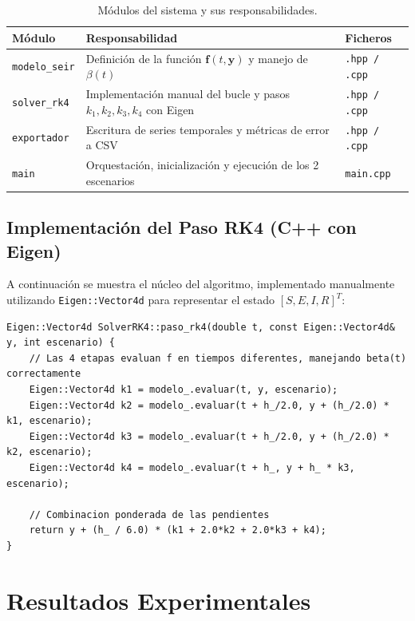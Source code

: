\documentclass[12pt,a4paper]{article}
\theoremstyle{definition}
\newcommand{\vect}[1]{\mathbf{#1}}
\begin{document}
\begin{table}[H]
\centering
\caption{M\'{o}dulos del sistema y sus responsabilidades.}
\label{tab:modulos}
\begin{tabular}{@{}lp{7cm}l@{}}
\toprule
\textbf{M\'{o}dulo} & \textbf{Responsabilidad} & \textbf{Ficheros} \\
\midrule
\texttt{modelo\_seir} & Definici\'{o}n de la funci\'{o}n $\vect{f}(t, \vect{y})$ y manejo de $\beta(t)$ & \texttt{.hpp / .cpp} \\
\texttt{solver\_rk4} & Implementaci\'{o}n manual del bucle y pasos $k_1, k_2, k_3, k_4$ con Eigen & \texttt{.hpp / .cpp} \\
\texttt{exportador} & Escritura de series temporales y m\'{e}tricas de error a CSV & \texttt{.hpp / .cpp} \\
\texttt{main} & Orquestaci\'{o}n, inicializaci\'{o}n y ejecuci\'{o}n de los 2 escenarios & \texttt{main.cpp} \\
\bottomrule
\end{tabular}
\end{table}

\subsection{Implementaci\'{o}n del Paso RK4 (C++ con Eigen)}

A continuaci\'{o}n se muestra el n\'{u}cleo del algoritmo, implementado manualmente utilizando \texttt{Eigen::Vector4d} para representar el estado $[S, E, I, R]^T$:

\begin{lstlisting}[caption={N\'{u}cleo del m\'{e}todo RK4 implementado desde cero en C++.}]
Eigen::Vector4d SolverRK4::paso_rk4(double t, const Eigen::Vector4d& y, int escenario) {
    // Las 4 etapas evaluan f en tiempos diferentes, manejando beta(t) correctamente
    Eigen::Vector4d k1 = modelo_.evaluar(t, y, escenario);
    Eigen::Vector4d k2 = modelo_.evaluar(t + h_/2.0, y + (h_/2.0) * k1, escenario);
    Eigen::Vector4d k3 = modelo_.evaluar(t + h_/2.0, y + (h_/2.0) * k2, escenario);
    Eigen::Vector4d k4 = modelo_.evaluar(t + h_, y + h_ * k3, escenario);
    
    // Combinacion ponderada de las pendientes
    return y + (h_ / 6.0) * (k1 + 2.0*k2 + 2.0*k3 + k4);
}
\end{lstlisting}

\section{Resultados Experimentales}\label{sec:resultados}
\end{document}
